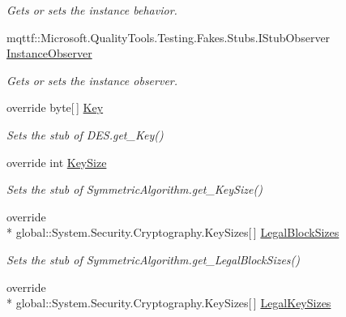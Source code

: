 \begin{DoxyCompactItemize}
\begin{DoxyCompactList}\small\item\em Gets or sets the instance behavior.\end{DoxyCompactList}\item 
mqttf\-::\-Microsoft.\-Quality\-Tools.\-Testing.\-Fakes.\-Stubs.\-I\-Stub\-Observer \hyperlink{class_system_1_1_security_1_1_cryptography_1_1_fakes_1_1_stub_d_e_s_a81e6902ba8cf9464e2c623c07a2ed058}{Instance\-Observer}
\begin{DoxyCompactList}\small\item\em Gets or sets the instance observer.\end{DoxyCompactList}\item 
override byte\mbox{[}$\,$\mbox{]} \hyperlink{class_system_1_1_security_1_1_cryptography_1_1_fakes_1_1_stub_d_e_s_a430e3d5411d9577b731819c3b37b946b}{Key}
\begin{DoxyCompactList}\small\item\em Sets the stub of D\-E\-S.\-get\-\_\-\-Key()\end{DoxyCompactList}\item 
override int \hyperlink{class_system_1_1_security_1_1_cryptography_1_1_fakes_1_1_stub_d_e_s_aa671db5b6d066da1768ea1d6c8edcdfc}{Key\-Size}
\begin{DoxyCompactList}\small\item\em Sets the stub of Symmetric\-Algorithm.\-get\-\_\-\-Key\-Size()\end{DoxyCompactList}\item 
override \\*
global\-::\-System.\-Security.\-Cryptography.\-Key\-Sizes\mbox{[}$\,$\mbox{]} \hyperlink{class_system_1_1_security_1_1_cryptography_1_1_fakes_1_1_stub_d_e_s_a0a40f88d98b5c7783ad732bd22586e04}{Legal\-Block\-Sizes}
\begin{DoxyCompactList}\small\item\em Sets the stub of Symmetric\-Algorithm.\-get\-\_\-\-Legal\-Block\-Sizes()\end{DoxyCompactList}\item 
override \\*
global\-::\-System.\-Security.\-Cryptography.\-Key\-Sizes\mbox{[}$\,$\mbox{]} \hyperlink{class_system_1_1_security_1_1_cryptography_1_1_fakes_1_1_stub_d_e_s_abe494308339d6d34745bc87506ca2872}{Legal\-Key\-Sizes}

\end{DoxyCompactItemize}
